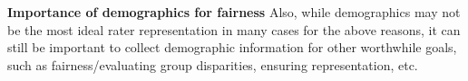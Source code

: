 \documentclass[11pt]{article}
\begin{document}
\textbf{Importance of demographics for fairness}
Also, while demographics may not be the most ideal rater representation in many cases for the above reasons, it can still be important to collect demographic information for other worthwhile goals, such as fairness/evaluating group disparities, ensuring representation, etc.

\newpage



\newpage




\newpage

\appendix

\setcounter{figure}{0}
\renewcommand{\thefigure}{A\arabic{figure}}






\end{document}
